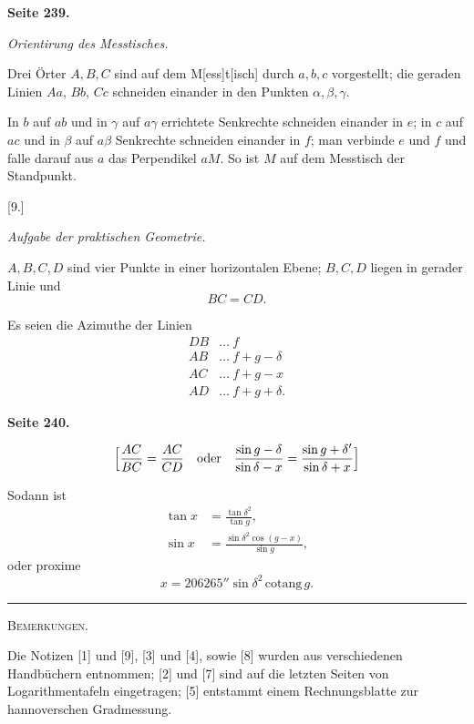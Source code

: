 \documentclass[12pt,a4paper]{article}
\newcommand{\tang}{\tan}
\theoremstyle{plain}
\theoremstyle{definition}
\theoremstyle{remark}
\begin{document}
\newpage
\textbf{Seite 239.}\quad [8.]

\begin{center}
\emph{Orientirung des Messtisches.}
\end{center}

Drei Örter $A, B, C$ sind auf dem M[ess]t[isch] durch $a, b, c$ vorgestellt; die geraden Linien $Aa$, $Bb$, $Cc$ schneiden einander in den Punkten $\alpha, \beta, \gamma$.

In $b$ auf $ab$ und in $\gamma$ auf $a\gamma$ errichtete Senkrechte schneiden einander in $e$; in $c$ auf $ac$ und in $\beta$ auf $a\beta$ Senkrechte schneiden einander in $f$; man verbinde $e$ und $f$ und falle darauf aus $a$ das Perpendikel $aM$. So ist $M$ auf dem Messtisch der Standpunkt.

\medskip
\begin{center}
[9.]

\emph{Aufgabe der praktischen Geometrie.}
\end{center}

$A, B, C, D$ sind vier Punkte in einer horizontalen Ebene; $B, C, D$ liegen in gerader Linie und
\[
BC = CD.
\]

Es seien die Azimuthe der Linien
\begin{align*}
DB &\ldots\ f \\
AB &\ldots\ f + g - \delta \\
AC &\ldots\ f + g - x \\
AD &\ldots\ f + g + \delta.
\end{align*}

\newpage
\textbf{Seite 240.}

\[
\Bigl[\frac{AC}{BC} = \frac{AC}{CD} \quad \text{oder} \quad \frac{\sin g - \delta}{\sin \delta - x} = \frac{\sin g + \delta'}{\sin \delta + x}\Bigr]
\]

Sodann ist
\begin{align*}
\tang x &= \frac{\tang \delta^2}{\tang g}, \\
\sin x &= \frac{\sin \delta^2 \cos(g - x)}{\sin g},
\end{align*}
oder proxime
\[
x = 206265'' \sin \delta^2 \, \mathrm{cotang}\, g.
\]

\medskip
\hrule
\medskip

\begin{center}
\textsc{Bemerkungen.}
\end{center}

Die Notizen [1] und [9], [3] und [4], sowie [8] wurden aus verschiedenen Handbüchern entnommen; [2] und [7] sind auf die letzten Seiten von Logarithmentafeln eingetragen; [5] entstammt einem Rechnungsblatte zur hannoverschen Gradmessung.
\end{document}
